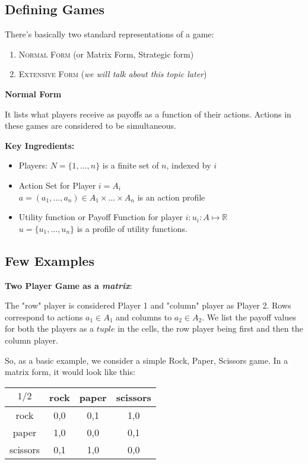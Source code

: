 	\subsection{Defining Games}
	
		There's basically two standard representations of a game:
		\begin{enumerate}
			\item \textsc{Normal Form} (or Matrix Form, Strategic form)
			
			\item \textsc{Extensive Form} (\textit{we will talk about this topic later})
		\end{enumerate}
		
		\begin{large}\textbf{Normal Form}\end{large}\newline
		
		It lists what players receive as payoffs as a function of their actions. Actions in these games are considered to be 			simultaneous.
		
		\textbf{Key Ingredients:}
			\begin{itemize}
			\item {Players}: $N = \{1, \dots, n\}$ is a finite set of $n$, indexed by $i$
			\item {Action Set} for Player $i =A_i$\\
			$a = (a_1, \dots , a_n) \in A_1 \times \dots \times A_n$ is an action profile
			\item{Utility function or Payoff Function} for player $i: u_i : A \mapsto \mathbb{R}$\\
			$u = \{u_1, \dots , u_n\}$ is a profile of utility functions.
			\end{itemize}
\subsection{Few Examples }
		\textbf{Two Player Game as a \textit{matrix}}:\newline
		
		The "row" player is considered Player 1 and "column" player as Player 2. 
		Rows correspond to actions $a_1 \in A_1$ and columns to $a_2 \in A_2$.
		We list the payoff values for both the players as a $tuple$ in the cells, the row player being first and then the column 		player.\newline
		
		So, as a basic example, we consider a simple Rock, Paper, Scissors game. In a matrix form, it would look like this:\\
		\begin{center}
		\begin{tabular}{|c|c|c|c|} \hline
		$1/2$ & rock & paper & scissors\\ \hline
		rock & 0,0 & 0,1 & 1,0 \\ \hline
		paper & 1,0 & 0,0 & 0,1 \\ \hline
		scissors & 0,1 & 1,0 & 0,0 \\ \hline
		\end{tabular}
		\end{center}
		
